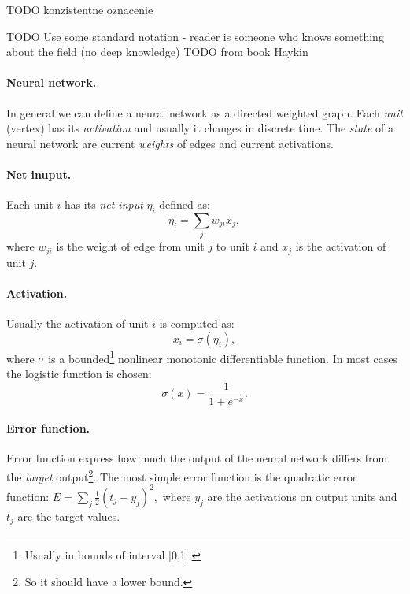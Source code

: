 
TODO konzistentne oznacenie 

\newcommand{\argmin}{\operatornamewithlimits{arg\,min}}
\newcommand{\Bx}{{\bf x}}
\newcommand{\By}{{\bf y}}
\newcommand{\Bh}{{\bf h}}
\newcommand{\Bw}{{\bf w}}
\newcommand{\Bc}{{\bf c}}

TODO Use some standard notation - reader is someone who knows something about the field (no deep knowledge) 
TODO from book Haykin 

\paragraph{Neural network.}

In general we can define a neural network as a directed weighted graph. Each \emph{unit} (vertex) has its \emph{activation} and usually it changes in discrete time. The \emph{state} of a neural network are current \emph{weights} of edges and current activations. 

\paragraph{Net inuput.}
Each unit $i$ has its \emph{net input} $\eta_i$ defined as:
$$\eta_i = \sum_j w_{ji}x_j,$$
where $w_{ji}$ is the weight of edge from unit $j$ to unit $i$ and $x_j$ is the activation of unit $j$.

\paragraph{Activation.}
Usually the activation of unit $i$ is computed as:
$$x_i = \sigma(\eta_i),$$
where $\sigma$ is a bounded\footnote{
Usually in bounds of interval [0,1].
} nonlinear monotonic differentiable function. In most cases the logistic function is chosen:
$$\sigma(x) = \frac{1}{1 + e^{-x}}.$$

\paragraph{Error function.}
Error function express how much the output of the neural network differs from the \emph{target} output\footnote{
So it should have a lower bound. 
}. The most simple error function is the quadratic error function:
$E = \sum_j \frac{1}{2}(t_j-y_j)^2,$
where $y_j$ are the activations on output units and $t_j$ are the target values.

